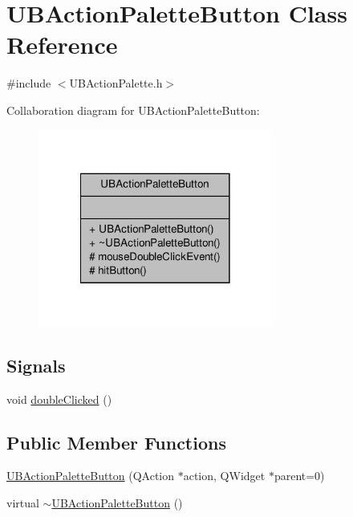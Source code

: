 \hypertarget{class_u_b_action_palette_button}{\section{U\-B\-Action\-Palette\-Button Class Reference}
\label{d8/d5a/class_u_b_action_palette_button}
}


{\ttfamily \#include $<$U\-B\-Action\-Palette.\-h$>$}



Collaboration diagram for U\-B\-Action\-Palette\-Button\-:
\nopagebreak
\begin{figure}[H]
\begin{center}
\leavevmode
\includegraphics[width=218pt]{dc/def/class_u_b_action_palette_button__coll__graph}
\end{center}
\end{figure}
\subsection*{Signals}
\begin{DoxyCompactItemize}
\item 
void \hyperlink{class_u_b_action_palette_button_a6a4ca694925647292f3cd13c8d861375}{double\-Clicked} ()
\end{DoxyCompactItemize}
\subsection*{Public Member Functions}
\begin{DoxyCompactItemize}
\item 
\hyperlink{class_u_b_action_palette_button_ada5d0f33c9d6c1437bd8828904435df5}{U\-B\-Action\-Palette\-Button} (Q\-Action $\ast$action, Q\-Widget $\ast$parent=0)
\item 
virtual \hyperlink{class_u_b_action_palette_button_a7b9652e3ff3ba8a3962e7248c62f7e04}{$\sim$\-U\-B\-Action\-Palette\-Button} ()
\end{DoxyCompactItemize}
